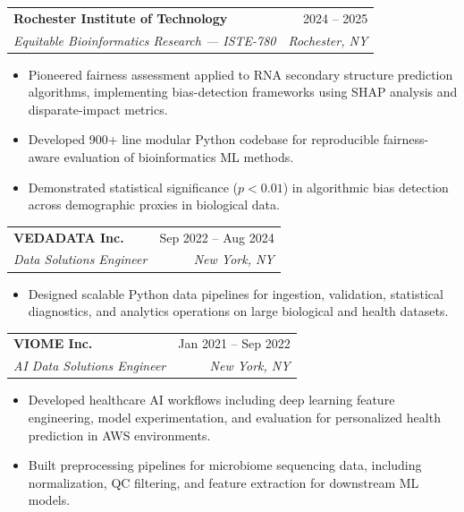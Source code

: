 \documentclass[11pt]{article}
\makeatletter
\newcommand{\entry}[4]{
  \noindent\begin{tabularx}{\textwidth}{@{}Xr@{}}
    \textbf{#1} & #2 \\
    \textit{#3} & \textit{#4}
  \end{tabularx}\vspace{2pt}
}
\makeatother
\begin{document}
\entry{Rochester Institute of Technology}{2024 -- 2025}{Equitable Bioinformatics Research --- ISTE-780}{Rochester, NY}
\begin{itemize}
  \item Pioneered fairness assessment applied to RNA secondary structure prediction algorithms, implementing bias-detection frameworks using SHAP analysis and disparate-impact metrics.
  \item Developed 900+ line modular Python codebase for reproducible fairness-aware evaluation of bioinformatics ML methods.
  \item Demonstrated statistical significance ($p < 0.01$) in algorithmic bias detection across demographic proxies in biological data.
\end{itemize}

\entry{VEDADATA Inc.}{Sep 2022 -- Aug 2024}{Data Solutions Engineer}{New York, NY}
\begin{itemize}
  \item Designed scalable Python data pipelines for ingestion, validation, statistical diagnostics, and analytics operations on large biological and health datasets.
\end{itemize}

\entry{VIOME Inc.}{Jan 2021 -- Sep 2022}{AI Data Solutions Engineer}{New York, NY}
\begin{itemize}
  \item Developed healthcare AI workflows including deep learning feature engineering, model experimentation, and evaluation for personalized health prediction in AWS environments.
  \item Built preprocessing pipelines for microbiome sequencing data, including normalization, QC filtering, and feature extraction for downstream ML models.
\end{itemize}
\end{document}
